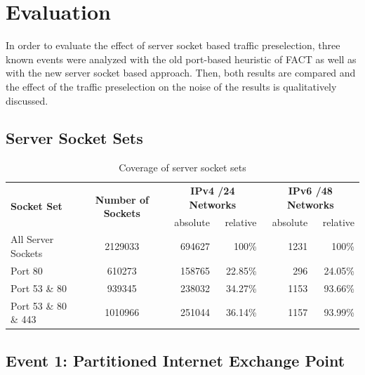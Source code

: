 

\chapter{Evaluation\label{chapter:results}}

In order to evaluate the effect of server socket based traffic preselection, three known events were analyzed with the old port-based heuristic of FACT as well as with the new server socket based approach. Then, both results are compared and the effect of the traffic preselection on the noise of the results is qualitatively discussed.

\section{Server Socket Sets}
\begin{table}
	[ht] \centering 
	\begin{tabular}
		{|l|c|r|r|r|r|} \hline \multirow{2}{*}{\textbf{Socket Set}} & \multirow{2}{*}{\textbf{Number of Sockets}} & \multicolumn{2}{|c|}{\textbf{IPv4 /24 Networks}} & \multicolumn{2}{|c|}{\textbf{IPv6 /48 Networks}} \\
		\cline{3-6} & & absolute & relative & absolute & relative \\
		\hline \hline All Server Sockets & 2129033 & 694627 & 100\% & 1231 & 100\% \\
		\hline Port 80 & 610273 & 158765 & 22.85\% & 296 & 24.05\% \\
		\hline Port 53 \& 80 & 939345 & 238032 & 34.27\% & 1153 & 93.66\% \\
		\hline Port 53 \& 80 \& 443 & 1010966 & 251044 & 36.14\% & 1157 & 93.99\% \\
		\hline 
	\end{tabular}
	\caption{Coverage of server socket sets} 
\end{table}


\section{Event 1: Partitioned Internet Exchange Point}

